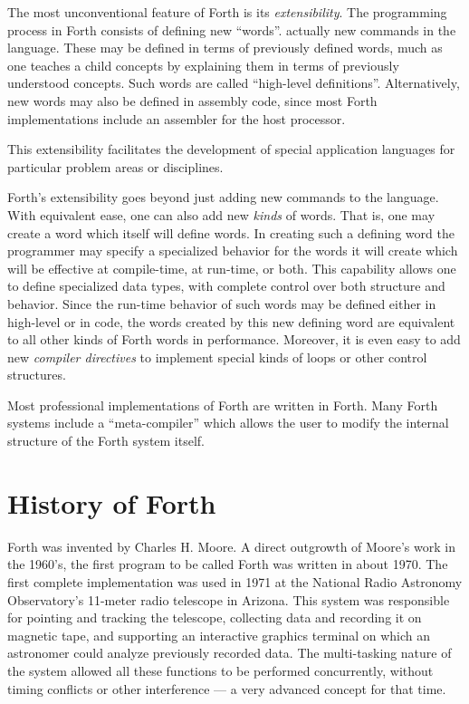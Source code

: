 The most unconventional feature of Forth is its \emph{extensibility}.
The programming process in Forth consists of defining new ``words''.
actually new commands in the language. These may be defined in terms
of previously defined words, much as one teaches a child concepts by
explaining them in terms of previously understood concepts. Such
words are called ``high-level definitions''. Alternatively, new
words may also be defined in assembly code, since most Forth
implementations include an assembler for the host processor.

This extensibility facilitates the development of special application
languages for particular problem areas or disciplines.

Forth's extensibility goes beyond just adding new commands to the
language. With equivalent ease, one can also add new \emph{kinds} of
words. That is, one may create a word which itself will define
words. In creating such a defining word the programmer may specify
a specialized behavior for the words it will create which will be
effective at compile-time, at run-time, or both. This capability
allows one to define specialized data types, with complete control
over both structure and behavior. Since the run-time behavior of
such words may be defined either in high-level or in code, the words
created by this new defining word are equivalent to all other kinds
of Forth words in performance. Moreover, it is even easy to add new
\emph{compiler directives} to implement special kinds of loops or
other control structures.

Most professional implementations of Forth are written in Forth.
Many Forth systems include a ``meta-compiler'' which allows the user
to modify the internal structure of the Forth system itself.


\section{History of Forth} %

Forth was invented by Charles H. Moore. A direct outgrowth of Moore's
work in the 1960's, the first program to be called Forth was written
in about 1970. The first complete implementation was used in 1971 at
the National Radio Astronomy Observatory's 11-meter radio telescope
in Arizona. This system was responsible for pointing and tracking the
telescope, collecting data and recording it on magnetic tape, and
supporting an interactive graphics terminal on which an astronomer
could analyze previously recorded data. The multi-tasking nature of
the system allowed all these functions to be performed concurrently,
without timing conflicts or other interference --- a very advanced
concept for that time.

